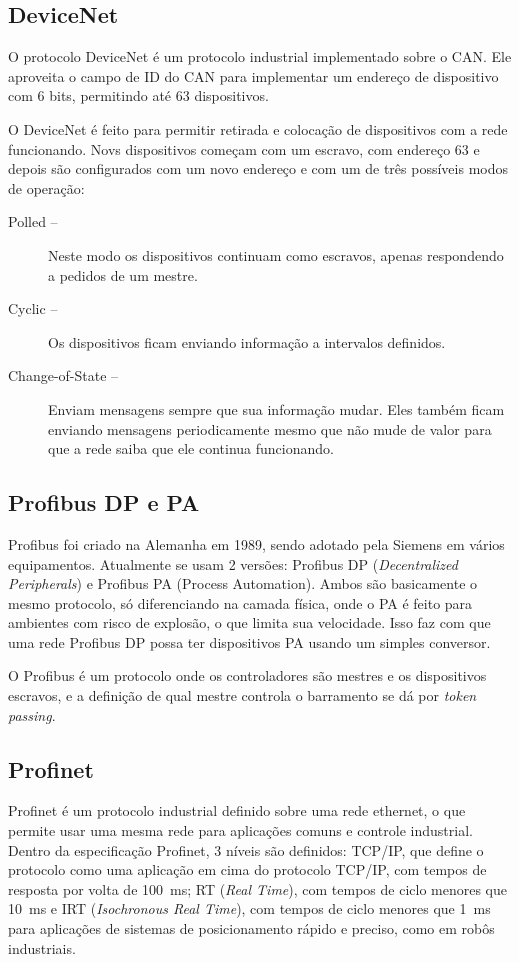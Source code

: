 \subsection{DeviceNet}
O protocolo DeviceNet é um protocolo industrial implementado sobre o CAN. Ele aproveita o campo de ID do CAN para implementar um endereço de dispositivo com 6 bits, permitindo até 63 dispositivos.

O DeviceNet é feito para permitir retirada e colocação de dispositivos com a rede funcionando. Novs dispositivos começam com um escravo, com endereço 63 e depois são configurados com um novo endereço e com um de três possíveis modos de operação:
\begin{description}
    \item[Polled -- ]Neste modo os dispositivos continuam como escravos, apenas respondendo a pedidos de um mestre.
    \item[Cyclic -- ]Os dispositivos ficam enviando informação a intervalos definidos.
    \item[Change-of-State --] Enviam mensagens sempre que sua informação mudar. Eles também ficam enviando mensagens periodicamente mesmo que não mude de valor para que a rede saiba que ele continua funcionando.
\end{description}

\subsection{Profibus DP e PA}
Profibus foi criado na Alemanha em 1989, sendo adotado pela Siemens em vários equipamentos. Atualmente se usam 2 versões: Profibus DP (\emph{Decentralized Peripherals}) e Profibus PA (Process Automation). Ambos são basicamente o mesmo protocolo, só diferenciando na camada física, onde o PA é feito para ambientes com risco de explosão, o que limita sua velocidade. Isso faz com que uma rede Profibus DP possa ter dispositivos PA usando um simples conversor.

O Profibus é um protocolo onde os controladores são mestres e os dispositivos escravos, e a definição de qual mestre controla o barramento se dá por \emph{token passing}.

\subsection{Profinet}
Profinet é um protocolo industrial definido sobre uma rede ethernet, o que permite usar uma mesma rede para aplicações comuns e controle industrial. Dentro da especificação Profinet, 3 níveis são definidos: TCP/IP, que define o protocolo como uma aplicação em cima do protocolo TCP/IP, com tempos de resposta por volta de \SI{100}{ms}; RT (\emph{Real Time}), com tempos de ciclo menores que \SI{10}{ms} e IRT (\emph{Isochronous Real Time}), com tempos de ciclo menores que \SI{1}{ms} para aplicações de sistemas de posicionamento rápido e preciso, como em robôs industriais.

